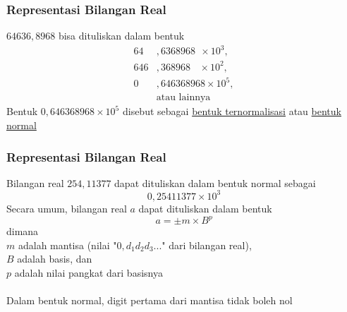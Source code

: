 \documentclass{beamer}
\begin{document}
\begin{frame}
\frametitle{Representasi Bilangan Real}
$64636,8968$ bisa dituliskan dalam bentuk 
\begin{equation}
\begin{split}
64&,6368968 \ \ \times 10^3 ,
\\646&,368968 \ \ \ \ \times 10^2 , 
\\0&,646368968 \times 10^5 ,
\\&\text{atau lainnya}
\end{split}
\nonumber
\end{equation}
Bentuk $0,646368968 \times 10^5$ disebut sebagai \underline{bentuk ternormalisasi} atau \underline{bentuk normal}
\end{frame}


\begin{frame}
\frametitle{Representasi Bilangan Real}
Bilangan real $254,11377$ dapat dituliskan dalam bentuk normal sebagai 
\begin{equation}
0,25411377 \times 10^3
\nonumber
\end{equation}
Secara umum, bilangan real $a$ dapat dituliskan dalam bentuk
\begin{equation}
a = \pm m \times B^p
\nonumber
\end{equation}
dimana \\$m$ adalah mantisa (nilai "$0,d_1d_2d_3...$" dari bilangan real), \\$B$ adalah basis, dan \\$p$ adalah nilai pangkat dari basisnya
\\\ \\Dalam bentuk normal, digit pertama dari mantisa tidak boleh nol
\end{frame}
\end{document}
